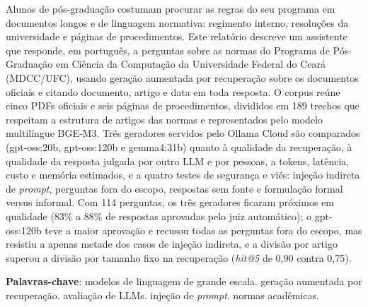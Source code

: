 \documentclass[12pt,openright,oneside,a4paper,english,brazil]{abntex2}
\renewcommand{\imprimircapa}{%
  \begin{capa}%
    \center
    {\ABNTEXchapterfont\large\imprimirinstituicao}
    \vspace*{1.5cm}

    {\ABNTEXchapterfont\large\imprimirautor}
    \vfill
    \begin{center}
      \ABNTEXchapterfont\bfseries\LARGE\imprimirtitulo
    \end{center}
    \vfill
    \large\imprimirlocal
    \par
    \large\imprimirdata
    \vspace*{1cm}
  \end{capa}
}
\begin{document}
\frenchspacing

\imprimircapa
\imprimirfolhaderosto

\begin{resumo}
Alunos de pós-graduação costumam procurar as regras do seu programa em documentos
longos e de linguagem normativa: regimento interno, resoluções da universidade e
páginas de procedimentos. Este relatório descreve um assistente que responde, em
português, a perguntas sobre as normas do Programa de Pós-Graduação em Ciência da
Computação da Universidade Federal do Ceará (MDCC/UFC), usando geração aumentada por
recuperação sobre os documentos oficiais e citando documento, artigo e data em toda
resposta. O corpus reúne cinco PDFs oficiais e seis páginas de procedimentos,
divididos em 189 trechos que respeitam a estrutura de artigos das normas e
representados pelo modelo multilíngue BGE-M3. Três geradores servidos pelo Ollama
Cloud são comparados (gpt-oss:20b, gpt-oss:120b e gemma4:31b) quanto à qualidade da
recuperação, à qualidade da resposta julgada por outro LLM e por pessoas, a tokens,
latência, custo e memória estimados, e a quatro testes de segurança e viés: injeção
indireta de \textit{prompt}, perguntas fora do escopo, respostas sem fonte e
formulação formal versus informal. Com 114 perguntas, os três geradores ficaram próximos em qualidade (83\% a 88\% de respostas aprovadas pelo juiz automático); o gpt-oss:120b teve a maior aprovação e recusou todas as perguntas fora do escopo, mas resistiu a apenas metade dos casos de injeção indireta, e a divisão por artigo superou a divisão por tamanho fixo na recuperação (\textit{hit@5} de 0,90 contra 0,75).

\textbf{Palavras-chave}: modelos de linguagem de grande escala. geração aumentada por
recuperação. avaliação de LLMs. injeção de \textit{prompt}. normas acadêmicas.
\end{resumo}
\end{document}
